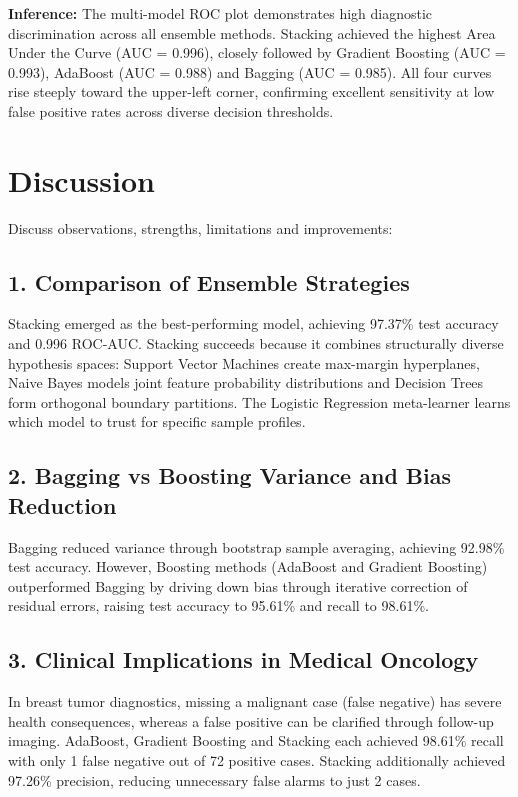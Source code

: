 \documentclass[12pt,a4paper]{article}
\begin{document}
\textbf{Inference:}
The multi-model ROC plot demonstrates high diagnostic discrimination across all ensemble methods. Stacking achieved the highest Area Under the Curve (AUC = 0.996), closely followed by Gradient Boosting (AUC = 0.993), AdaBoost (AUC = 0.988) and Bagging (AUC = 0.985). All four curves rise steeply toward the upper-left corner, confirming excellent sensitivity at low false positive rates across diverse decision thresholds.

\section{Discussion}
Discuss observations, strengths, limitations and improvements:

\subsection*{1. Comparison of Ensemble Strategies}
Stacking emerged as the best-performing model, achieving 97.37\% test accuracy and 0.996 ROC-AUC. Stacking succeeds because it combines structurally diverse hypothesis spaces: Support Vector Machines create max-margin hyperplanes, Naive Bayes models joint feature probability distributions and Decision Trees form orthogonal boundary partitions. The Logistic Regression meta-learner learns which model to trust for specific sample profiles.

\subsection*{2. Bagging vs Boosting Variance and Bias Reduction}
Bagging reduced variance through bootstrap sample averaging, achieving 92.98\% test accuracy. However, Boosting methods (AdaBoost and Gradient Boosting) outperformed Bagging by driving down bias through iterative correction of residual errors, raising test accuracy to 95.61\% and recall to 98.61\%.

\subsection*{3. Clinical Implications in Medical Oncology}
In breast tumor diagnostics, missing a malignant case (false negative) has severe health consequences, whereas a false positive can be clarified through follow-up imaging. AdaBoost, Gradient Boosting and Stacking each achieved 98.61\% recall with only 1 false negative out of 72 positive cases. Stacking additionally achieved 97.26\% precision, reducing unnecessary false alarms to just 2 cases.
\end{document}
